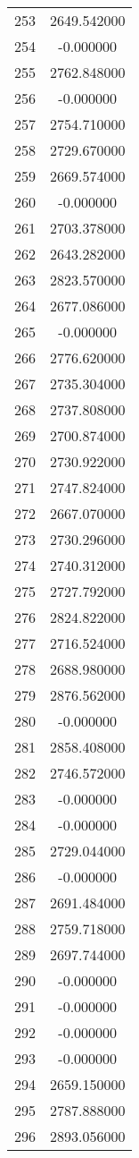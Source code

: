 \documentclass[12pt]{article}
\begin{document}
\begin{longtable}{@{}cc@{}}
253 & 2649.542000 \\
254 & -0.000000 \\
255 & 2762.848000 \\
256 & -0.000000 \\
257 & 2754.710000 \\
258 & 2729.670000 \\
259 & 2669.574000 \\
260 & -0.000000 \\
261 & 2703.378000 \\
262 & 2643.282000 \\
263 & 2823.570000 \\
264 & 2677.086000 \\
265 & -0.000000 \\
266 & 2776.620000 \\
267 & 2735.304000 \\
268 & 2737.808000 \\
269 & 2700.874000 \\
270 & 2730.922000 \\
271 & 2747.824000 \\
272 & 2667.070000 \\
273 & 2730.296000 \\
274 & 2740.312000 \\
275 & 2727.792000 \\
276 & 2824.822000 \\
277 & 2716.524000 \\
278 & 2688.980000 \\
279 & 2876.562000 \\
280 & -0.000000 \\
281 & 2858.408000 \\
282 & 2746.572000 \\
283 & -0.000000 \\
284 & -0.000000 \\
285 & 2729.044000 \\
286 & -0.000000 \\
287 & 2691.484000 \\
288 & 2759.718000 \\
289 & 2697.744000 \\
290 & -0.000000 \\
291 & -0.000000 \\
292 & -0.000000 \\
293 & -0.000000 \\
294 & 2659.150000 \\
295 & 2787.888000 \\
296 & 2893.056000 \\

\end{longtable}
\end{document}
